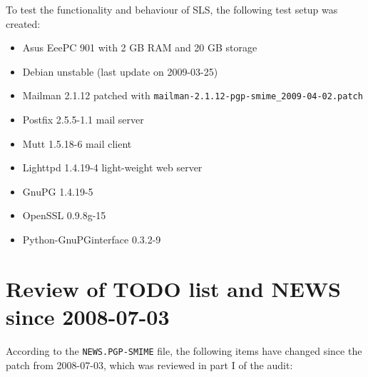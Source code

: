 \documentclass[a4]{article}
\newcommand{\file}[1]{\texttt{#1}}
\begin{document}
To test the functionality and behaviour of SLS, the following test setup was created:
\begin{itemize}
\item Asus EeePC 901 with 2 GB RAM and 20 GB storage
\item Debian unstable (last update on 2009-03-25)
\item Mailman 2.1.12 patched with \file{mailman-2.1.12-pgp-smime\_2009-04-02.patch}
\item Postfix 2.5.5-1.1 mail server
\item Mutt 1.5.18-6 mail client
\item Lighttpd 1.4.19-4 light-weight web server
\item GnuPG 1.4.19-5
\item OpenSSL 0.9.8g-15
\item Python-GnuPGinterface 0.3.2-9
\end{itemize}

\section{Review of TODO list and NEWS since 2008-07-03}\label{sec:todolist}

According to the \file{NEWS.PGP-SMIME} file, the following items have changed since the patch from 2008-07-03, which was reviewed in part I of the audit:
\end{document}
